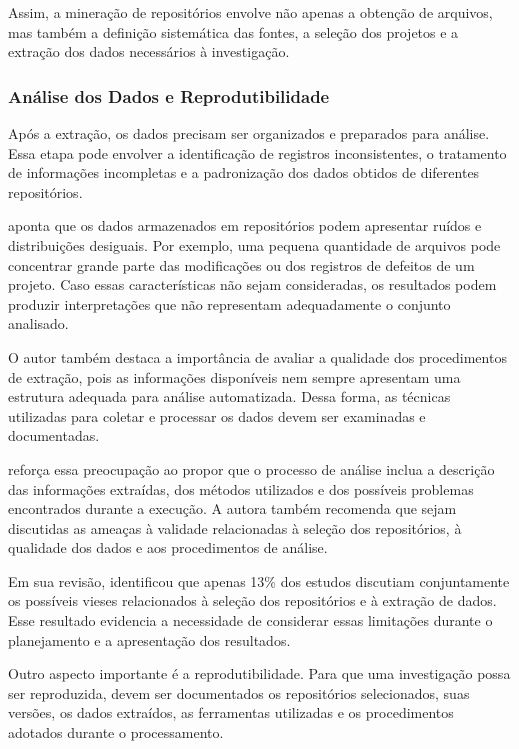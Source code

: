 Assim, a mineração de repositórios envolve não apenas a obtenção de arquivos, mas também a definição sistemática das fontes, a seleção dos projetos e a extração dos dados necessários à investigação.

\subsubsection{Análise dos Dados e Reprodutibilidade}

Após a extração, os dados precisam ser organizados e preparados para análise. Essa etapa pode envolver a identificação de registros inconsistentes, o tratamento de informações incompletas e a padronização dos dados obtidos de diferentes repositórios.

 aponta que os dados armazenados em repositórios podem apresentar ruídos e distribuições desiguais. Por exemplo, uma pequena quantidade de arquivos pode concentrar grande parte das modificações ou dos registros de defeitos de um projeto. Caso essas características não sejam consideradas, os resultados podem produzir interpretações que não representam adequadamente o conjunto analisado.

O autor também destaca a importância de avaliar a qualidade dos procedimentos de extração, pois as informações disponíveis nem sempre apresentam uma estrutura adequada para análise automatizada. Dessa forma, as técnicas utilizadas para coletar e processar os dados devem ser examinadas e documentadas.

 reforça essa preocupação ao propor que o processo de análise inclua a descrição das informações extraídas, dos métodos utilizados e dos possíveis problemas encontrados durante a execução. A autora também recomenda que sejam discutidas as ameaças à validade relacionadas à seleção dos repositórios, à qualidade dos dados e aos procedimentos de análise.

Em sua revisão,  identificou que apenas 13\% dos estudos discutiam conjuntamente os possíveis vieses relacionados à seleção dos repositórios e à extração de dados. Esse resultado evidencia a necessidade de considerar essas limitações durante o planejamento e a apresentação dos resultados.

Outro aspecto importante é a reprodutibilidade. Para que uma investigação possa ser reproduzida, devem ser documentados os repositórios selecionados, suas versões, os dados extraídos, as ferramentas utilizadas e os procedimentos adotados durante o processamento.

